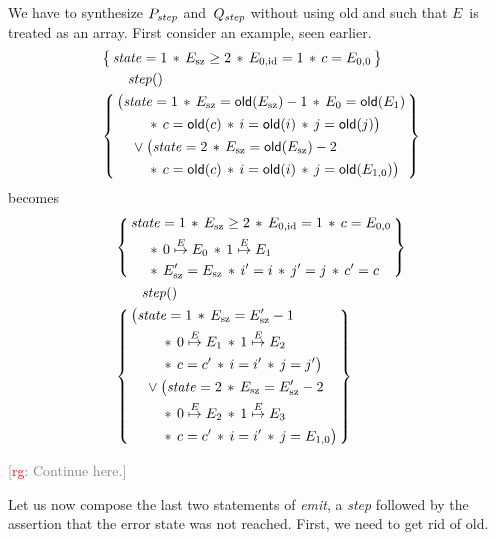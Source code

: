 \documentclass{article} %
\newcommand{\3}[3]{\{\,#1\,\}\;#2\;\{\,#3\,\}}
\newcommand{\eto}{\stackrel E\mapsto}
\renewcommand{\*}{\,*\,}
\newcommand{\noterg}[2]{\textcolor{gray}{[\textcolor{red}{#1}: #2]}}
\newcommand{\rg}[1]{\noterg{rg}{#1}}
\begin{document}
We have to synthesize $P_{\it step}$ and~$Q_{\it step}$ without using {\sf old} and such that $E$~is treated as an array.
First consider an example, seen earlier.
\begin{align*}
  &\left\{\,\begin{aligned}
  {\it state}=1 \* E_{\rm sz}\ge2 \* E_{0,{\rm id}}=1 \* c=E_{0,0}
  \end{aligned}\,\right\}\\
  &\qquad{\it step}() \\
  &\left\{\,\begin{aligned}
  &\bigl(
    {\it state}=1 \* E_{\rm sz}={\sf old}(E_{\rm sz})-1 \* E_0={\sf old}(E_1) \\
  &\qquad\* c={\sf old}(c) \* i={\sf old}(i) \* j={\sf old}(j) \bigr) \\
  &\quad\lor\bigl(
    {\it state}=2 \* E_{\rm sz}={\sf old}(E_{\rm sz})-2 \\
  &\qquad\* c={\sf old}(c) \* i={\sf old}(i) \* j={\sf old}(E_{1,0}) \bigr)
  \end{aligned}\,\right\}
\end{align*}
becomes
\begin{align*}
  &\left\{\,\begin{aligned}
  &{\it state}=1 \* E_{\rm sz}\ge2 \* E_{0,{\rm id}}=1 \* c=E_{0,0} \\
  &\quad\* 0\eto E_0 \* 1\eto E_1 \\
  &\quad\* E'_{\rm sz}=E_{\rm sz}\* i'=i \* j'=j \* c'=c
  \end{aligned}\,\right\} \\
  &\qquad{\it step}() \\
  &\left\{\,\begin{aligned}
  &\bigl(
    {\it state}=1 \* E_{\rm sz}=E'_{\rm sz}-1 \\
  &\qquad\* 0\eto E_1 \* 1\eto E_2 \\
  &\qquad\* c=c' \* i=i' \* j=j' \bigr) \\
  &\quad\lor\bigl(
    {\it state}=2 \* E_{\rm sz}=E'_{\rm sz}-2 \\
  &\qquad\* 0\eto E_2 \* 1\eto E_3 \\
  &\qquad\* c=c' \* i=i' \* j=E_{1,0} \bigr)
  \end{aligned}\,\right\}
\end{align*}


\rg{Continue here.}

\medskip


Let us now compose the last two statements of {\it emit}, a {\it step\/} followed by the assertion that the error state was not reached.
First, we need to get rid of {\sf old}.
\end{document}
